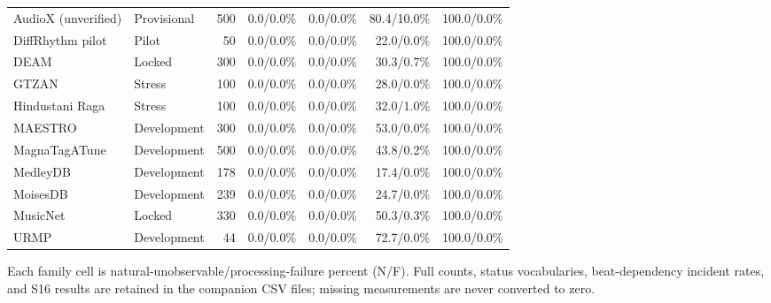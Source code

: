 \begin{longtable}{llrrrrr}
AudioX (unverified) & Provisional & 500 & 0.0/0.0\% & 0.0/0.0\% & 80.4/10.0\% & 100.0/0.0\% \\
DiffRhythm pilot & Pilot & 50 & 0.0/0.0\% & 0.0/0.0\% & 22.0/0.0\% & 100.0/0.0\% \\
DEAM & Locked & 300 & 0.0/0.0\% & 0.0/0.0\% & 30.3/0.7\% & 100.0/0.0\% \\
GTZAN & Stress & 100 & 0.0/0.0\% & 0.0/0.0\% & 28.0/0.0\% & 100.0/0.0\% \\
Hindustani Raga & Stress & 100 & 0.0/0.0\% & 0.0/0.0\% & 32.0/1.0\% & 100.0/0.0\% \\
MAESTRO & Development & 300 & 0.0/0.0\% & 0.0/0.0\% & 53.0/0.0\% & 100.0/0.0\% \\
MagnaTagATune & Development & 500 & 0.0/0.0\% & 0.0/0.0\% & 43.8/0.2\% & 100.0/0.0\% \\
MedleyDB & Development & 178 & 0.0/0.0\% & 0.0/0.0\% & 17.4/0.0\% & 100.0/0.0\% \\
MoisesDB & Development & 239 & 0.0/0.0\% & 0.0/0.0\% & 24.7/0.0\% & 100.0/0.0\% \\
MusicNet & Locked & 330 & 0.0/0.0\% & 0.0/0.0\% & 50.3/0.3\% & 100.0/0.0\% \\
URMP & Development & 44 & 0.0/0.0\% & 0.0/0.0\% & 72.7/0.0\% & 100.0/0.0\% \\
\bottomrule
\end{longtable}
{\footnotesize Each family cell is natural-unobservable/processing-failure percent (N/F). Full counts, status vocabularies, beat-dependency incident rates, and S16 results are retained in the companion CSV files; missing measurements are never converted to zero.}
